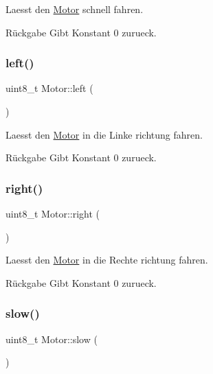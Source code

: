 Laesst den \hyperlink{class_motor}{Motor} schnell fahren.

\begin{DoxyReturn}{Rückgabe}
Gibt Konstant 0 zurueck. 
\end{DoxyReturn}
\hypertarget{class_motor_ae8af72c3a398bb959090d0be1083f5d7}{}\label{class_motor_ae8af72c3a398bb959090d0be1083f5d7} 
\subsubsection{\texorpdfstring{left()}{left()}}
{\footnotesize\ttfamily uint8\+\_\+t Motor\+::left (\begin{DoxyParamCaption}{ }\end{DoxyParamCaption})}

Laesst den \hyperlink{class_motor}{Motor} in die Linke richtung fahren.

\begin{DoxyReturn}{Rückgabe}
Gibt Konstant 0 zurueck. 
\end{DoxyReturn}
\hypertarget{class_motor_a517e585f6a9a335347f9a1230d2fc0e1}{}\label{class_motor_a517e585f6a9a335347f9a1230d2fc0e1} 
\subsubsection{\texorpdfstring{right()}{right()}}
{\footnotesize\ttfamily uint8\+\_\+t Motor\+::right (\begin{DoxyParamCaption}{ }\end{DoxyParamCaption})}

Laesst den \hyperlink{class_motor}{Motor} in die Rechte richtung fahren.

\begin{DoxyReturn}{Rückgabe}
Gibt Konstant 0 zurueck. 
\end{DoxyReturn}
\hypertarget{class_motor_a960a19729dc479265b1e5fea243de4c0}{}\label{class_motor_a960a19729dc479265b1e5fea243de4c0} 
\subsubsection{\texorpdfstring{slow()}{slow()}}
{\footnotesize\ttfamily uint8\+\_\+t Motor\+::slow (\begin{DoxyParamCaption}{ }\end{DoxyParamCaption})}

